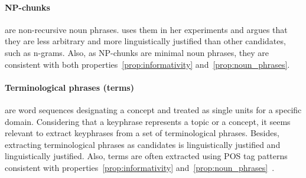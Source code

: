   \paragraph{NP-chunks} are non-recursive noun phrases.
   uses them in her experiments and argues
  that they are less arbitrary and more linguistically justified than other
  candidates, such as n-grams. Also, as NP-chunks are minimal noun phrases,
  they are consistent with both properties~\ref{prop:informativity}
  and~\ref{prop:noun_phrases}.

  \paragraph{Terminological phrases (terms)} are word sequences designating a
  concept and treated as single units for a specific domain. Considering that a
  keyphrase represents a topic or a concept, it seems relevant to extract
  keyphrases from  a set of terminological phrases. Besides, extracting
  terminological phrases as candidates is linguistically justified and
  linguistically justified. Also, terms are often extracted using POS tag
  patterns consistent with properties~\ref{prop:informativity}
  and~\ref{prop:noun_phrases}~\cite{castellvi2001automatictermdetection}.

